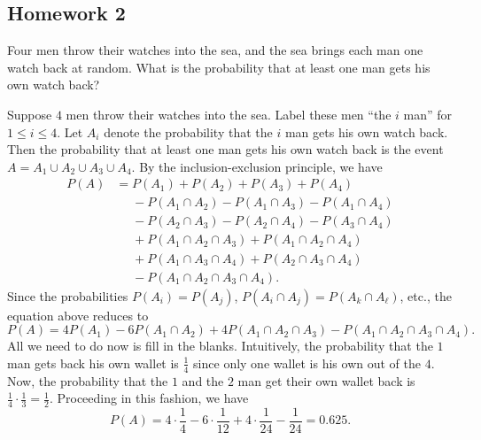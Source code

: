 \subsection{Homework 2}
\begin{problem}[Handout 2, \# 5]
  Four men throw their watches into the sea, and the sea brings each man
  one watch back at random. What is the probability that at least one man
  gets his own watch back?
\end{problem}
\begin{solution*}
  Suppose \(4\) men throw their watches into the sea. Label these men ``the
  \(i\) man'' for \(1\leq i\leq 4\). Let \(A_i\) denote the
  probability that the \(i\) man gets his own watch back. Then
  the probability that at least one man gets his own watch back is the
  event \(A=A_1\cup A_2\cup A_3\cup A_4\). By the inclusion-exclusion
  principle, we have
  \begin{equation}
    \label{eq:inclusion-exclusion-4}
    \begin{aligned}
      P(
      A)&=P(A_1)+P(A_2)+P(A_3)+P(A_4)\\
      &\phantom{{}={}}-P(A_1\cap A_2)-P(A_1\cap A_3)-P(A_1\cap A_4)\\
      &\phantom{{}={}}-P(A_2\cap A_3)-P(A_2\cap A_4)-P(A_3\cap A_4)\\
      &\phantom{{}={}}+P(A_1\cap A_2\cap A_3)+P(A_1\cap A_2\cap A_4)\\
      &\phantom{{}={}}+P(A_1\cap A_3\cap A_4)+P(A_2\cap A_3\cap A_4)\\
      &\phantom{{}={}}-P(A_1\cap A_2\cap A_3\cap A_4).
    \end{aligned}
  \end{equation}
  Since the probabilities \(P(A_i)=P(A_j)\), \(P(A_i\cap A_j)=P(A_k\cap
  A_\ell)\), etc., the equation above reduces to
  \[
    P(A)=4P(A_1)-6P(A_1\cap A_2)+4P(A_1\cap A_2\cap A_3)-P(A_1\cap A_2\cap
    A_3\cap A_4).
  \]
  All we need to do now is fill in the blanks. Intuitively, the probability
  that the \(1\) man gets back his own wallet is
  \(\frac{1}{4}\) since only one wallet is his own out of the \(4\). Now,
  the probability that the \(1\) and the \(2\) man
  get their own wallet back is
  \(\frac{1}{4}\cdot\frac{1}{3}=\frac{1}{2}\). Proceeding in this fashion,
  we have
  \[
    P(A)=4\cdot\frac{1}{4}-6\cdot\frac{1}{12}+4\cdot\frac{1}{24}-\frac{1}{24}
    =0.625.
  \]
\end{solution*}

